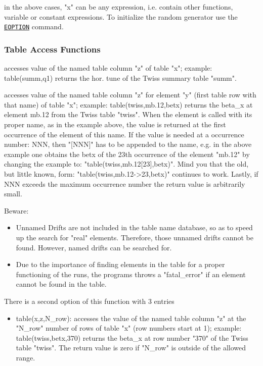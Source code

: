 in the above cases, "x" can be any expression, i.e. contain other
functions, variable or constant expressions. To initialize the \madx
random generator use the \hyperref[sec:eoption]{\tt EOPTION} command.

\subsubsection{Table Access Functions}
\label{subsubsec:table}

\begin{madlist}
   accesses value of the named table column "z"
  of table "x"; example: table(summ,q1) returns the hor. tune of
  the Twiss summary table "summ".  

   accesses value of the named table column "z"
  for element "y" (first table row with that name) of table "x";
  example: table(twiss,mb.12,betx) returns the beta\_x at
  element mb.12 from the Twiss table "twiss".   When the element
  is called with its proper name, as in the example above, the
  value is returned at the first occurrence of the element of
  this name. If the value is needed at a occurrence number: NNN,
  then "[NNN]" has to be appended to the name, e.g. in the above
  example one obtains the betx of the 23th occurrence of the
  element "mb.12" by changing the example to:
  "table(twiss,mb.12[23],betx)". Mind you that the old, but
  little known, form: "table(twiss,mb.12-\textgreater 23,betx)"
  continues to work. Lastly, if NNN exceeds the maximum
  occurrence number the return value is arbitrarily small.  
\end{madlist}

Beware: 
\begin{itemize}
   \item  Unnamed Drifts are not included in the table name
          database, so as to speed up the search for "real"
          elements. Therefore, those  unnamed drifts cannot be
          found. However, named drifts can be searched for.  
   \item  Due to the importance of finding elements in the table
          for a proper functioning of the \madx runs, the programs
          throws a "fatal\_error" if an element cannot be found in the
          table.   
\end{itemize}

There is a second option of this function with 3 entries  
\begin{itemize}
    \item table(x,z,N\_row): accesses the value of the named table
          column  "z" at the "N\_row" number of rows of table "x" (row
          numbers start at  1); example: table(twiss,betx,370) returns
          the beta\_x at row number  "370" of the Twiss table
          "twiss". The return value is zero if "N\_row"  is outside of
          the allowed range.
\end{itemize}

